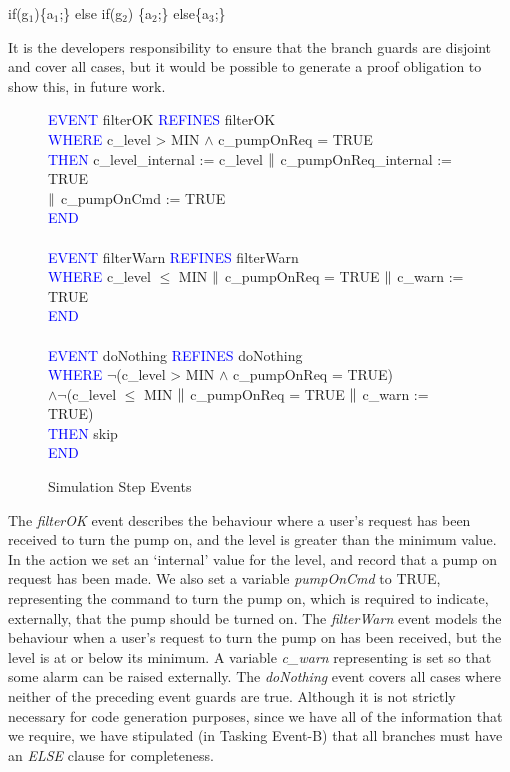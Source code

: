 \documentclass{llncs}%
\begin{document}
\vspace*{-0.2cm}
\begin{minipage}{\textwidth}
\centering
if(g$_1$)\{a$_1$;\} else if(g$_2$) \{a$_2$;\} else\{a$_3$;\}
\end{minipage} 
%
It is the developers responsibility to ensure that the branch guards are disjoint and cover all cases, but it would be possible to generate a proof obligation to show this, in future work.
%
\begin{figure}
\centering
\begin{minipage}{0.9\textwidth}
\textcolor{blue}{EVENT} filterOK \textcolor{blue}{REFINES} filterOK \\
\textcolor{blue}{WHERE} c\_level >  MIN $\land$ c\_pumpOnReq = TRUE \\
\textcolor{blue}{THEN} c\_level\_internal :=  c\_level $\mathbin\|$ c\_pumpOnReq\_internal :=  TRUE\\
\hspace*{0.9cm}$\mathbin\|$ c\_pumpOnCmd :=  TRUE \\
\textcolor{blue}{END}\\
\vspace*{-0.25cm}\\
\textcolor{blue}{EVENT} filterWarn \textcolor{blue}{REFINES} filterWarn\\
\textcolor{blue}{WHERE} c\_level $\leq$  MIN $\mathbin\|$ c\_pumpOnReq = TRUE $\mathbin\|$ c\_warn :=  TRUE\\
\textcolor{blue}{END}\\
\vspace*{-0.25cm}\\
\textcolor{blue}{EVENT} doNothing \textcolor{blue}{REFINES} doNothing\\
\textcolor{blue}{WHERE} $\lnot$(c\_level >  MIN $\land$ c\_pumpOnReq = TRUE) \\
\hspace*{1.1cm}$\land \lnot$(c\_level $\leq$  MIN $\mathbin\|$ c\_pumpOnReq = TRUE $\mathbin\|$ c\_warn :=  TRUE)\\
 \textcolor{blue}{THEN} skip\\
 \textcolor{blue}{END}
\end{minipage}
\caption{Simulation Step Events}
\label{fig:FMUEvents}
\end{figure}
%
The \emph{filterOK} event describes the behaviour where a user's request has been received to turn the pump on, and the level is greater than the minimum value. In the action we set an `internal' value for the level, and record that a pump on request has been made. We also set a variable \emph{pumpOnCmd} to TRUE, representing the command to turn the pump on, which is required to indicate, externally, that the pump should be turned on. The \emph{filterWarn} event models the behaviour when a user's request to turn the pump on has been received, but the level is at or below its minimum. A variable \emph{c\_warn} representing is set so that some alarm can be raised externally. The \emph{doNothing} event covers all cases where neither of the preceding event guards are true. Although it is not strictly necessary for code generation purposes, since we have all of the information that we require, we have stipulated (in Tasking Event-B) that all branches must have an \emph{ELSE} clause for completeness. 
\end{document}
